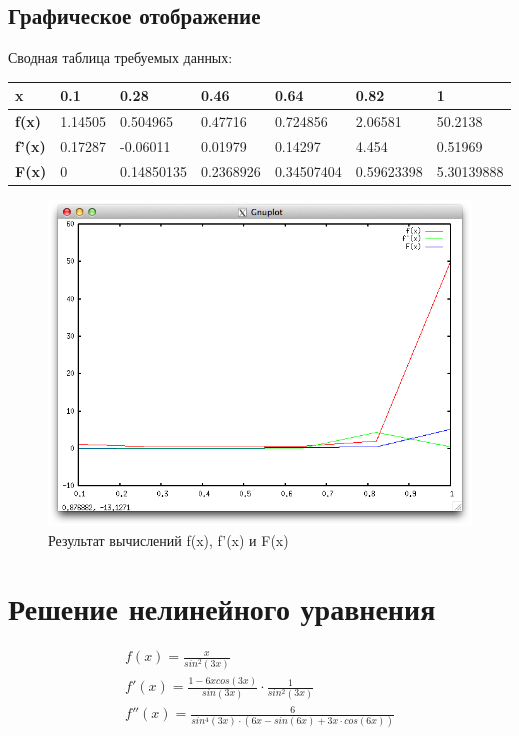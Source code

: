 \documentclass{article}
\begin{document}
\subsection{Графическое отображение}
Сводная таблица требуемых данных:
\begin{table}[h!]
  \begin{tabular}{|l|l|l|l|l|l|l|}
  \hline
  \bfseries x & 0.1 & 0.28 & 0.46 & 0.64 & 0.82 & 1\\
  \hline
  \bfseries f(x) & 1.14505 & 0.504965 & 0.47716 & 0.724856 & 2.06581 & 50.2138\\
  \hline
  \bfseries f'(x) & 0.17287 & -0.06011 & 0.01979 & 0.14297 & 4.454 & 0.51969\\
  \hline
  \bfseries F(x) & 0 & 0.14850135 & 0.2368926 & 0.34507404 & 0.59623398 &5.30139888\\
  \hline
  \end{tabular}
\end{table}

\begin{figure}[h!]
  \includegraphics[width=13cm]{result_of_integ_diff.png}
  \caption{Результат вычислений f(x), f'(x) и F(x)}
  \label{interpolations_img}
\end{figure}

\section{Решение нелинейного уравнения}

\begin{displaymath}
  \begin{array}{ccc}
    f(x) = \frac{x}{sin^2(3x)}  \\
    f'(x) = \frac{1 - 6x cos(3x)}{sin(3 x)} \cdot \frac{1}{sin^2(3 x)}\\
    f''(x) = \frac{6}{sin^4(3x) \cdot (6x - sin(6x) + 3x \cdot cos(6x))}\\
  \end{array}
\end{displaymath}
\end{document}

